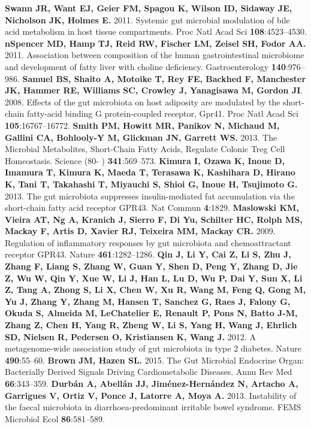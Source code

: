 \documentclass[12pt,oneside,letterpaper]{article}
\begin{document}
\clearpage
\begin{thebibliography}{99}
 {\bf Swann JR, Want EJ, Geier FM, Spagou K, Wilson ID, Sidaway JE, Nicholson JK, Holmes E.} 2011. Systemic gut microbial modulation of bile acid metabolism in host tissue compartments. Proc Natl Acad Sci {\bf 108}:4523–4530.
 {\bf nSpencer MD, Hamp TJ, Reid RW, Fischer LM, Zeisel SH, Fodor AA.} 2011. Association between composition of the human gastrointestinal microbiome and development of fatty liver with choline deficiency. Gastroenterology {\bf 140}:976–986.
 {\bf Samuel BS, Shaito A, Motoike T, Rey FE, Backhed F, Manchester JK, Hammer RE, Williams SC, Crowley J, Yanagisawa M, Gordon JI}. 2008. Effects of the gut microbiota on host adiposity are modulated by the short-chain fatty-acid binding G protein-coupled receptor, Gpr41. Proc Natl Acad Sci {\bf 105}:16767–16772.
 {\bf Smith PM, Howitt MR, Panikov N, Michaud M, Gallini CA, Bohlooly-Y M, Glickman JN, Garrett WS.} 2013. The Microbial Metabolites, Short-Chain Fatty Acids, Regulate Colonic Treg Cell Homeostasis. Science (80- ) {\bf 341}:569–573.
 {\bf Kimura I, Ozawa K, Inoue D, Imamura T, Kimura K, Maeda T, Terasawa K, Kashihara D, Hirano K, Tani T, Takahashi T, Miyauchi S, Shioi G, Inoue H, Tsujimoto G.} 2013. The gut microbiota suppresses insulin-mediated fat accumulation via the short-chain fatty acid receptor GPR43. Nat Commun {\bf 4}:1829.
 {\bf Maslowski KM, Vieira AT, Ng A, Kranich J, Sierro F, Di Yu, Schilter HC, Rolph MS, Mackay F, Artis D, Xavier RJ, Teixeira MM, Mackay CR.} 2009. Regulation of inflammatory responses by gut microbiota and chemoattractant receptor GPR43. Nature {\bf 461}:1282–1286.
 {\bf Qin J, Li Y, Cai Z, Li S, Zhu J, Zhang F, Liang S, Zhang W, Guan Y, Shen D, Peng Y, Zhang D, Jie Z, Wu W, Qin Y, Xue W, Li J, Han L, Lu D, Wu P, Dai Y, Sun X, Li Z, Tang A, Zhong S, Li X, Chen W, Xu R, Wang M, Feng Q, Gong M, Yu J, Zhang Y, Zhang M, Hansen T, Sanchez G, Raes J, Falony G, Okuda S, Almeida M, LeChatelier E, Renault P, Pons N, Batto J-M, Zhang Z, Chen H, Yang R, Zheng W, Li S, Yang H, Wang J, Ehrlich SD, Nielsen R, Pedersen O, Kristiansen K, Wang J.} 2012. A metagenome-wide association study of gut microbiota in type 2 diabetes. Nature {\bf 490}:55–60.
 {\bf Brown JM, Hazen SL.} 2015. The Gut Microbial Endocrine Organ: Bacterially Derived Signals Driving Cardiometabolic Diseases. Annu Rev Med {\bf 66}:343–359.
 {\bf Durbán A, Abellán JJ, Jiménez-Hernández N, Artacho A, Garrigues V, Ortiz V, Ponce J, Latorre A, Moya A.} 2013. Instability of the faecal microbiota in diarrhoea-predominant irritable bowel syndrome. FEMS Microbiol Ecol {\bf 86}:581–589.

\end{thebibliography}
\end{document}
